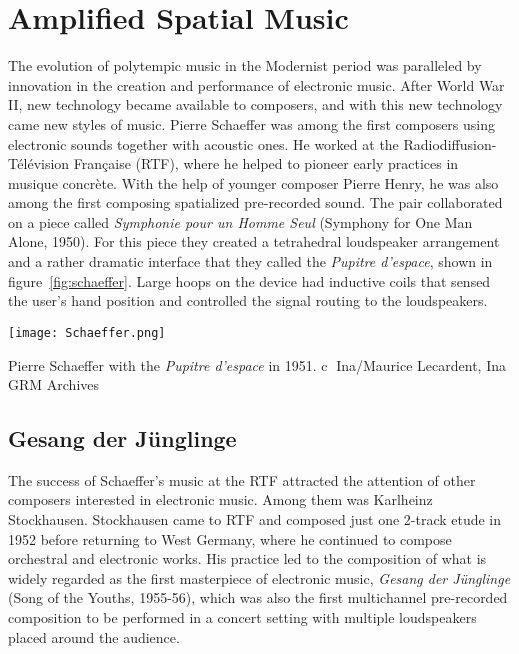 \section{Amplified Spatial Music}
\label{sec:spatial-developments}
The evolution of polytempic music in the Modernist period was
paralleled by innovation in the creation and performance of electronic
music. After World War II, new technology became available to
composers, and with this new technology came new styles of music.
Pierre Schaeffer was among the first composers using electronic sounds
together with acoustic ones.  He worked at the
Radiodiffusion-T\'{e}l\'{e}vision Fran\c{c}aise (RTF), where he helped
to pioneer early practices in musique concr\`{e}te. With the help of
younger composer Pierre Henry, he was also among the first composing
spatialized pre-recorded sound. The pair collaborated on a piece
called \textit{Symphonie pour un Homme Seul} (Symphony for One Man
Alone, 1950). For this piece they created a tetrahedral loudspeaker
arrangement and a rather dramatic interface that they called the
\textit{Pupitre d'espace}, shown in figure~\ref{fig:schaeffer}. Large
hoops on the device had inductive coils that sensed the user's hand
position and controlled the signal routing to the
loudspeakers.\cite{Holm2008}
\begin{marginfigure}
\texttt{[image: Schaeffer.png]}
\caption{Pierre Schaeffer with the \textit{Pupitre d'espace} in
  1951. \textcircled{c} Ina/Maurice Lecardent, Ina GRM Archives}
\label{fig:schaeffer}
\end{marginfigure}


\subsection{Gesang der J\"{u}nglinge}
The success of Schaeffer's music at the RTF attracted the attention of
other composers interested in electronic music. Among them was
Karlheinz Stockhausen. Stockhausen came to RTF and composed just one
2-track etude in 1952 before returning to West Germany, where he
continued to compose orchestral and electronic works. His practice led
to the composition of what is widely regarded as the first masterpiece
of electronic music, \textit{Gesang der J\"{u}nglinge} (Song of the
Youths, 1955-56), which was also the first multichannel pre-recorded
composition to be performed in a concert setting with multiple
loudspeakers placed around the audience\cite{Grout2006}. 

